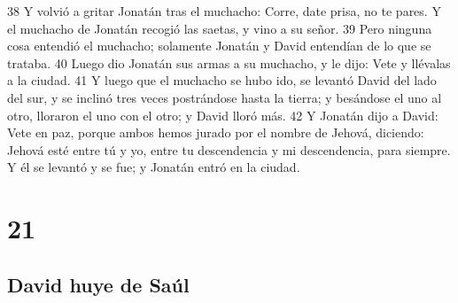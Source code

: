38 Y volvió a gritar Jonatán tras el muchacho: Corre, date prisa, no te pares. Y el muchacho de Jonatán recogió las saetas, y vino a su señor.
39 Pero ninguna cosa entendió el muchacho; solamente Jonatán y David entendían de lo que se trataba.
40 Luego dio Jonatán sus armas a su muchacho, y le dijo: Vete y llévalas a la ciudad.
41 Y luego que el muchacho se hubo ido, se levantó David del lado del sur, y se inclinó tres veces postrándose hasta la tierra; y besándose el uno al otro, lloraron el uno con el otro; y David lloró más.
42 Y Jonatán dijo a David: Vete en paz, porque ambos hemos jurado por el nombre de Jehová, diciendo: Jehová esté entre tú y yo, entre tu descendencia y mi descendencia, para siempre. Y él se levantó y se fue; y Jonatán entró en la ciudad.

\chapter{21}

\section*{David huye de Saúl}

